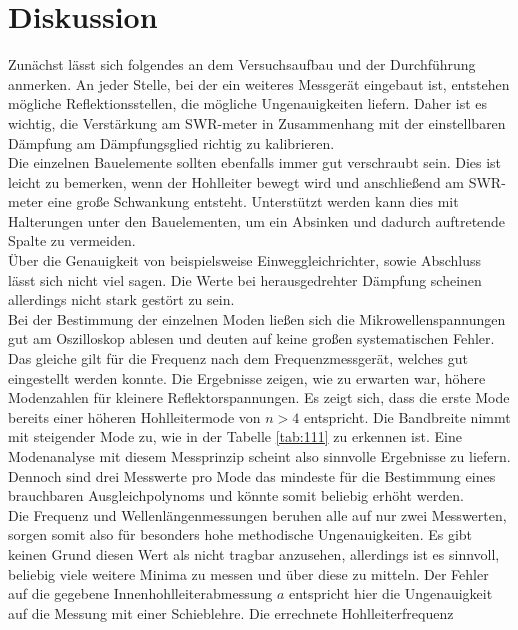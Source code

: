\section{Diskussion}

Zunächst lässt sich folgendes an dem Versuchsaufbau und der Durchführung anmerken. An jeder Stelle, bei der ein weiteres Messgerät
eingebaut ist, entstehen mögliche Reflektionsstellen, die mögliche Ungenauigkeiten liefern. Daher ist es 
wichtig, die Verstärkung am SWR-meter in Zusammenhang mit der einstellbaren Dämpfung am 
Dämpfungsglied richtig zu kalibrieren. 
\\
Die einzelnen Bauelemente sollten ebenfalls immer gut verschraubt sein. Dies ist leicht zu bemerken, wenn der Hohlleiter bewegt wird und 
anschließend am SWR-meter eine große Schwankung entsteht. Unterstützt werden kann dies mit Halterungen unter den Bauelementen, um ein Absinken und dadurch auftretende
Spalte zu vermeiden.
\\
Über die Genauigkeit von beispielsweise Einweggleichrichter, sowie Abschluss lässt sich nicht viel sagen. Die Werte bei
herausgedrehter Dämpfung scheinen allerdings nicht stark gestört zu sein.
\\
\newline
Bei der Bestimmung der einzelnen Moden ließen sich die Mikrowellenspannungen gut am Oszilloskop ablesen und deuten auf 
keine großen systematischen Fehler. Das gleiche gilt für die Frequenz nach dem Frequenzmessgerät, welches gut eingestellt werden konnte.
Die Ergebnisse zeigen, wie zu erwarten war, höhere Modenzahlen für kleinere Reflektorspannungen. Es zeigt sich, dass die erste Mode
bereits einer höheren Hohlleitermode von $n > 4$ entspricht. 
Die Bandbreite nimmt mit steigender Mode zu, wie in 
der Tabelle \ref{tab:111} zu erkennen ist. Eine Modenanalyse mit diesem Messprinzip scheint also sinnvolle Ergebnisse zu liefern. Dennoch sind drei Messwerte
pro Mode das mindeste für die Bestimmung eines brauchbaren Ausgleichpolynoms und könnte somit beliebig erhöht werden.
\\
\newline
Die Frequenz und Wellenlängenmessungen beruhen alle auf nur zwei Messwerten, sorgen somit also für besonders hohe methodische Ungenauigkeiten. Es gibt keinen Grund diesen
Wert als nicht tragbar anzusehen, allerdings ist es sinnvoll, beliebig viele weitere Minima zu messen und über diese zu mitteln. 
Der Fehler auf die gegebene Innenhohlleiterabmessung $a$ entspricht hier die Ungenauigkeit auf die Messung mit einer Schieblehre.
Die errechnete Hohlleiterfrequenz
